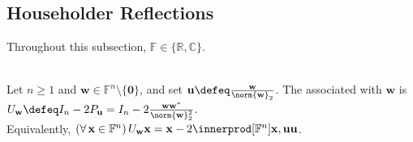 \subsection{Householder Reflections}

Throughout this subsection, $\mathbb{F}\in\{\mathbb{R},\mathbb{C}\}$.

\begin{definition} \label{def:householder-matrix} \\
Let $n\geq1$ and $\mathbf{w}\in\mathbb{F}^n\setminus\{\mathbf{0}\}$, and set $\mathbf{u}\defeq\frac{\mathbf{w}}{\norm{\mathbf{w}}_2}$. The  associated with $\mathbf{w}$ is $U_{\mathbf{w}}\defeq I_n-2P_{\mathbf{u}}=I_n-2\frac{\mathbf{w}\mathbf{w}^*}{\norm{\mathbf{w}}_2^2}$.\\
Equivalently, $(\forall\,\mathbf{x}\in\mathbb{F}^n)\,U_{\mathbf{w}}\mathbf{x}=\mathbf{x}-2\innerprod[\mathbb{F}^n]{\mathbf{x},\mathbf{u}}\mathbf{u}$.
\end{definition}

